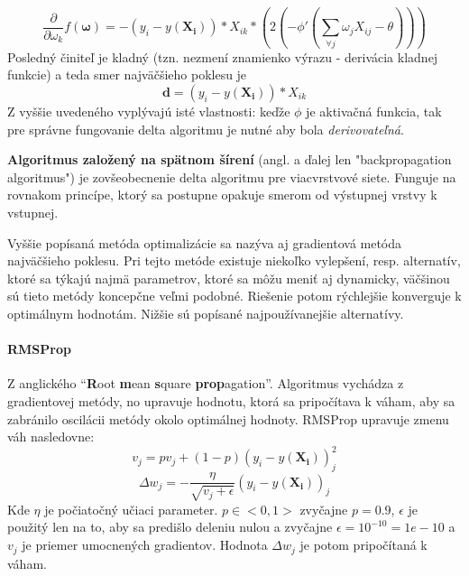 \begin{equation}
    \frac{\partial}{\partial \omega_k}f(\pmb{\omega})=-(y_i-y(\mathbf{X_i}))*X_{ik}*(2(-\phi'(\sum_{\forall j}{\omega_j X_{ij}-\theta})))
\end{equation}
Posledný činiteľ je kladný (tzn. nezmení znamienko výrazu - derivácia kladnej funkcie) a teda smer najväčšieho poklesu
je
\begin{equation}
    \pmb{d}=(y_i-y(\mathbf{X_i}))*X_{ik}
\end{equation}
Z vyššie uvedeného vyplývajú isté vlastnosti: keďže $\phi$ je aktivačná funkcia, tak pre správne fungovanie delta
algoritmu je nutné aby bola \emph{derivovateľná}.

\textbf{Algoritmus založený na spätnom šírení} (angl. a ďalej len "backpropagation algoritmus") je zovšeobecnenie delta
algoritmu pre viacvrstvové siete.
Funguje na rovnakom princípe, ktorý sa postupne opakuje smerom od výstupnej vrstvy k vstupnej.

Vyššie popísaná metóda optimalizácie sa nazýva aj gradientová metóda najväčšieho poklesu.
Pri tejto metóde existuje niekoľko vylepšení, resp. alternatív, ktoré sa týkajú najmä parametrov, ktoré sa môžu meniť
aj dynamicky, väčšinou sú tieto metódy koncepčne veľmi podobné.
Riešenie potom rýchlejšie konverguje k optimálnym hodnotám.
Nižšie sú popísané najpoužívanejšie alternatívy.
\paragraph{RMSProp}
Z anglického \enquote{\textbf{R}oot \textbf{m}ean \textbf{s}quare \textbf{prop}agation}.
Algoritmus vychádza z gradientovej metódy, no upravuje hodnotu, ktorá sa pripočítava k váham, aby sa zabránilo oscilácii
metódy okolo optimálnej hodnoty.
RMSProp upravuje zmenu váh nasledovne:
\begin{equation}
    v_j=pv_j+(1-p)(y_i-y(\mathbf{X_i}))_j^2
\end{equation}
\begin{equation}
    \Delta{w_j}=-\frac{\eta}{\sqrt{v_j+\epsilon}}(y_i-y(\mathbf{X_i}))_j
\end{equation}
Kde $\eta$ je počiatočný učiaci parameter.
$p \in <0,1>$ zvyčajne $p=0.9$, $\epsilon$ je použitý len na to, aby sa predišlo deleniu nulou a zvyčajne
$\epsilon = 10^{-10} = 1e-10$ a $v_j$ je priemer umocnených gradientov.
Hodnota $\Delta{w_j}$ je potom pripočítaná k váham.
